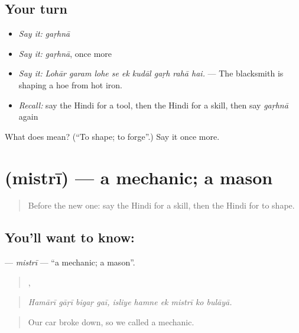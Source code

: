 \subsection*{Your turn}
\begin{itemize}
\raggedright
  \item \emph{Say it:} \emph{gaṛhnā}
  \item \emph{Say it:} \emph{gaṛhnā}, once more
  \item \emph{Say it:} \emph{Lohār garam lohe se ek kudāl gaṛh rahā hai.} — The blacksmith is shaping a hoe from hot iron.
  \item \emph{Recall:} say the Hindi for a tool, then the Hindi for a skill, then say \emph{gaṛhnā} again
\end{itemize}

\begin{tcolorbox}[breakable,colback=teal!4,colframe=teal!35!black,title={Before you move on}]
What does  mean? (\textquotedblleft{}To shape; to forge\textquotedblright{}.) Say it once more.
\end{tcolorbox}
\section[\texorpdfstring{\hi{मिस्त्री} (mistrī)}{मिस्त्री (mistrī)}]{ (mistrī) — a mechanic; a mason}

\label{lesson:HI-C506-mistri}



\begin{quote}
Before the new one: say the Hindi for a skill, then the Hindi for to shape.
\end{quote}

\subsection*{You'll want to know: }
\textbf{} — \emph{mistrī} — \textquotedblleft{}a mechanic; a mason\textquotedblright{}.

\begin{quote}
   ,      
\end{quote}

\begin{quote}
\emph{Hamārī gāṛī bigaṛ gaī, isliye hamne ek mistrī ko bulāyā.}
\end{quote}

\begin{quote}
Our car broke down, so we called a mechanic.
\end{quote}

